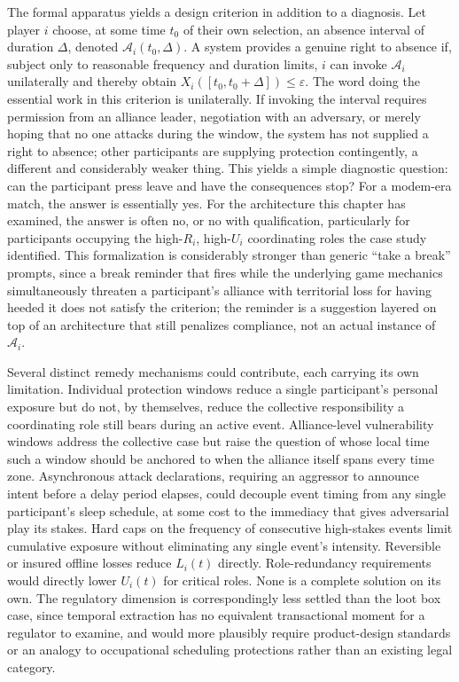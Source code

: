 The formal apparatus yields a design criterion in addition to a diagnosis. Let player $i$ choose, at some time $t_0$ of their own selection, an absence interval of duration $\Delta$, denoted $\mathcal{A}_i(t_0,\Delta)$. A system provides a genuine right to absence if, subject only to reasonable frequency and duration limits, $i$ can invoke $\mathcal{A}_i$ unilaterally and thereby obtain $X_i([t_0, t_0+\Delta]) \leq \varepsilon$. The word doing the essential work in this criterion is unilaterally. If invoking the interval requires permission from an alliance leader, negotiation with an adversary, or merely hoping that no one attacks during the window, the system has not supplied a right to absence; other participants are supplying protection contingently, a different and considerably weaker thing. This yields a simple diagnostic question: can the participant press leave and have the consequences stop? For a modem-era match, the answer is essentially yes. For the architecture this chapter has examined, the answer is often no, or no with qualification, particularly for participants occupying the high-$R_i$, high-$U_i$ coordinating roles the case study identified. This formalization is considerably stronger than generic ``take a break'' prompts, since a break reminder that fires while the underlying game mechanics simultaneously threaten a participant's alliance with territorial loss for having heeded it does not satisfy the criterion; the reminder is a suggestion layered on top of an architecture that still penalizes compliance, not an actual instance of $\mathcal{A}_i$.

Several distinct remedy mechanisms could contribute, each carrying its own limitation. Individual protection windows reduce a single participant's personal exposure but do not, by themselves, reduce the collective responsibility a coordinating role still bears during an active event. Alliance-level vulnerability windows address the collective case but raise the question of whose local time such a window should be anchored to when the alliance itself spans every time zone. Asynchronous attack declarations, requiring an aggressor to announce intent before a delay period elapses, could decouple event timing from any single participant's sleep schedule, at some cost to the immediacy that gives adversarial play its stakes. Hard caps on the frequency of consecutive high-stakes events limit cumulative exposure without eliminating any single event's intensity. Reversible or insured offline losses reduce $L_i(t)$ directly. Role-redundancy requirements would directly lower $U_i(t)$ for critical roles. None is a complete solution on its own. The regulatory dimension is correspondingly less settled than the loot box case, since temporal extraction has no equivalent transactional moment for a regulator to examine, and would more plausibly require product-design standards or an analogy to occupational scheduling protections rather than an existing legal category.

